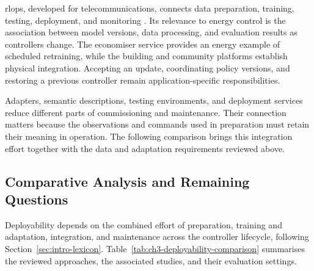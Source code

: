 \gls{rlops}, developed for telecommunications, connects data preparation, training, testing, deployment, and monitoring \parencite{li2022rlops}. Its relevance to energy control is the association between model versions, data processing, and evaluation results as controllers change. The economiser service provides an energy example of scheduled retraining, while the building and community platforms establish physical integration. Accepting an update, coordinating policy versions, and restoring a previous controller remain application-specific responsibilities.

Adapters, semantic descriptions, testing environments, and deployment services reduce different parts of commissioning and maintenance. Their connection matters because the observations and commands used in preparation must retain their meaning in operation. The following comparison brings this integration effort together with the data and adaptation requirements reviewed above.

\subsection{Comparative Analysis and Remaining Questions}
\label{sec:ch3-deployability-gaps}
\label{sec:ch2-gap-rq2}

Deployability depends on the combined effort of preparation, training and adaptation, integration, and maintenance across the controller lifecycle, following Section~\ref{sec:intro-lexicon}. Table~\ref{tab:ch3-deployability-comparison} summarises the reviewed approaches, the associated studies, and their evaluation settings.

